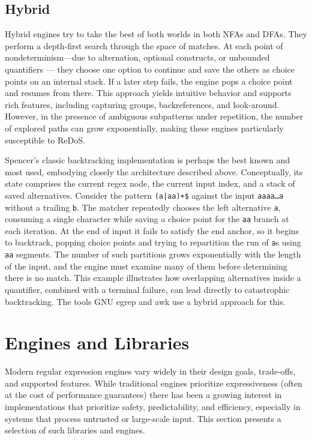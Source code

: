 \subsection{Hybrid}
Hybrid engines try to take the best of both worlds in both NFAs and DFAs. They perform a depth-first search through the space of matches. At each point of nondeterminism—due to alternation, optional constructs, or unbounded quantifiers — they choose one option to continue and save the others as choice points on an internal stack. If a later step fails, the engine pops a choice point and resumes from there. This approach yields intuitive behavior and supports rich features, including capturing groups, backreferences, and look-around. However, in the presence of ambiguous subpatterns under repetition, the number of explored paths can grow exponentially, making these engines particularly susceptible to ReDoS.

Spencer’s classic backtracking implementation is perhaps the best known and most used, embodying closely the architecture described above. Conceptually, its state comprises the current regex node, the current input index, and a stack of saved alternatives. Consider the pattern \texttt{(a|aa)+\$} against the input \texttt{aaaa\ldots a} without a trailing \texttt{b}. The matcher repeatedly chooses the left alternative \texttt{a}, consuming a single character while saving a choice point for the \texttt{aa} branch at each iteration. At the end of input it fails to satisfy the end anchor, so it begins to backtrack, popping choice points and trying to repartition the run of \texttt{a}s using \texttt{aa} segments. The number of such partitions grows exponentially with the length of the input, and the engine must examine many of them before determining there is no match. This example illustrates how overlapping alternatives inside a quantifier, combined with a terminal failure, can lead directly to catastrophic backtracking.
The tools GNU egrep and awk use a hybrid approach for this.

\section{Engines and Libraries}
Modern regular expression engines vary widely in their design goals, trade-offs, and supported features. While traditional engines prioritize expressiveness (often at the cost of performance guarantees) there has been a growing interest in implementations that prioritize safety, predictability, and efficiency, especially in systems that process untrusted or large-scale input. This section presents a selection of such libraries and engines.


